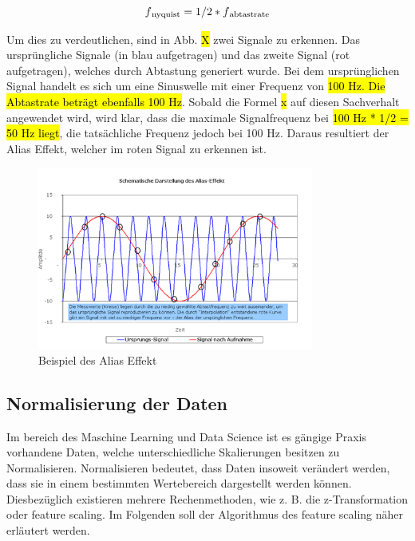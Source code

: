\begin{equation}
\label{Nyquist}
f\textsubscript{nyquist} = 1/2 * f\textsubscript{abtastrate}
\end{equation}


Um dies zu verdeutlichen, sind in Abb. \hl{X} zwei Signale zu erkennen. Das ursprüngliche Signale (in blau aufgetragen) und das zweite Signal (rot aufgetragen), welches durch Abtastung generiert wurde. Bei dem ursprünglichen Signal handelt es sich um eine Sinuswelle mit einer Frequenz von \hl{100 Hz. Die Abtastrate beträgt ebenfalls 100 Hz}. Sobald die Formel \hl{x} auf diesen Sachverhalt angewendet wird, wird klar, dass die maximale Signalfrequenz bei \hl{100 Hz * 1/2 = 50 Hz liegt}, die tatsächliche Frequenz jedoch bei 100 Hz. Daraus resultiert der Alias Effekt, welcher im roten Signal zu erkennen ist.

\begin{figure}[H]
    \centering
    \includegraphics[height= 6cm, width = \textwidth]{Pictures/Alias.png}
    \caption{Beispiel des Alias Effekt}
\end{figure}

\subsection{Normalisierung der Daten}
Im bereich des Maschine Learning und Data Science ist es gängige Praxis vorhandene Daten, welche unterschiedliche Skalierungen besitzen zu Normalisieren. Normalisieren bedeutet, dass Daten insoweit verändert werden, dass sie in einem bestimmten Wertebereich dargestellt werden können. Diesbezüglich existieren mehrere Rechenmethoden, wie z. B. die z-Transformation oder feature scaling. Im Folgenden soll der Algorithmus des feature scaling näher erläutert werden. 


